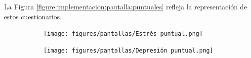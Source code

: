                 La Figura \ref{figure:implementacion:pantalla:puntuales} refleja la representación de estos cuestionarios.
                
                \begin{figure}[htbp]
                	\centering
                	\begin{subfigure}[c]{0.29\textwidth}
                		\centering
                		\texttt{[image: figures/pantallas/Estrés puntual.png]}
                	\end{subfigure}
                	\hspace{0.05\textwidth}
                	\begin{subfigure}[c]{0.29\textwidth}
                		\centering
                		\texttt{[image: figures/pantallas/Depresión puntual.png]}
                	\end{subfigure}
                    \hspace{0.05\textwidth}
                	\begin{subfigure}[c]{0.29\textwidth}
                		\centering

\end{subfigure}
\end{figure}
